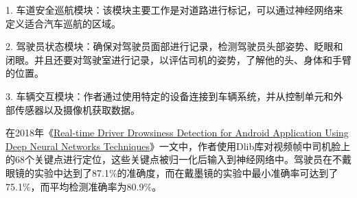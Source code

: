 1. 车道安全巡航模块：该模块主要工作是对道路进行标记，可以通过神经网络来定义适合汽车巡航的区域。

2. 驾驶员状态模块：确保对驾驶员面部进行记录，检测驾驶员头部姿势、眨眼和闭眼。并且还要对驾驶室进行记录，以评估司机的姿势，了解他的头、身体和手臂的位置。

3. 车辆交互模块：作者通过使用特定的设备连接到车辆系统，并从控制单元和外部传感器以及摄像机获取数据。

在2018年《\href{https://xueshu.baidu.com/usercenter/paper/show?paperid=67fb1a113a128dd8d5e40fec74fccf4b&site=xueshu_se&hitarticle=1}{Real-time Driver Drowsiness Detection for Android Application Using Deep Neural Networks Techniques}》一文中，作者使用Dlib库对视频帧中司机脸上的68个关键点进行定位，这些关键点被归一化后输入到神经网络中。驾驶员在不戴眼镜的实验中达到了87.1$\%$的准确度，而在戴墨镜的实验中最小准确率可达到了75.1$\%$，而平均检测准确率为80.9$\%$。

